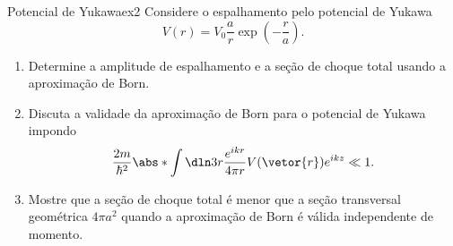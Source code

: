 \begin{exercício}{Potencial de Yukawa}{ex2}
   Considere o espalhamento pelo potencial de Yukawa
   \begin{equation*}
      V(r) = V_0\frac{a}r\exp\left(-\frac{r}{a}\right).
   \end{equation*}
   \begin{enumerate}[label=(\alph*)]
       \item Determine a amplitude de espalhamento e a seção de choque total usando a aproximação de Born.
       \item Discuta a validade da aproximação de Born para o potencial de Yukawa impondo 
          \begin{equation*}
             \frac{2m}{\hbar^2}\abs*{\int\dln3r \frac{e^{ikr}}{4\pi r} V(\vetor{r}) e^{ikz}} \ll 1.
          \end{equation*}
       \item Mostre que a seção de choque total é menor que a seção transversal geométrica \(4\pi a^2\) quando a aproximação de Born é válida independente de momento.
   \end{enumerate}
\end{exercício}
